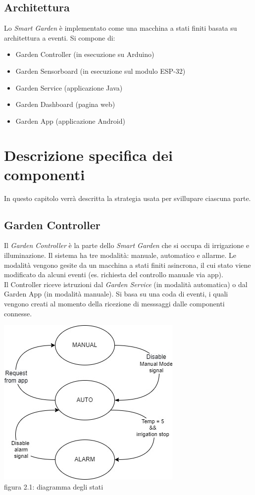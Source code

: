 \documentclass[a4paper,12pt]{report}
\begin{document}
\section{Architettura}
Lo \textit{Smart Garden} è implementato come una macchina a stati finiti basata su architettura a eventi. Si compone di:
\begin{itemize}
	\item Garden Controller (in esecuzione su Arduino)
	\item Garden Sensorboard (in esecuzione sul modulo ESP-32)
	\item Garden Service (applicazione Java)
	\item Garden Dashboard (pagina web)
	\item Garden App (applicazione Android)
\end{itemize}

\chapter{Descrizione specifica dei componenti}

In questo capitolo verrà descritta la strategia usata per svillupare ciascuna parte.

\section{Garden Controller}
Il \textit{Garden Controller} è la parte dello \textit{Smart Garden} che si occupa di irrigazione e illuminazione. Il sistema ha tre modalità: manuale, automatico e allarme. Le modalità vengono gesite da un macchina a stati finiti asincrona, il cui stato viene modificato da alcuni eventi (es. richiesta del controllo manuale via app). 
\\Il Controller riceve istruzioni dal \textit{Garden Service} (in modalità automatica) o dal {Garden App} (in modalità manuale). Si basa su una coda di eventi, i quali vengono creati al momento della ricezione di messsaggi dalle componenti connesse.

\begin{center}
	\includegraphics[scale = 0.65]{stateDiagram}
	\\figura 2.1: diagramma degli stati
\end{center}
\end{document}
